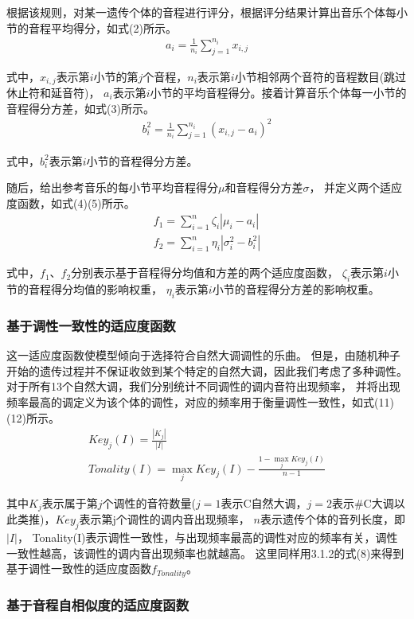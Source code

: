 \documentclass{article}
\begin{document}
根据该规则，对某一遗传个体的音程进行评分，根据评分结果计算出音乐个体每小节的音程平均得分，如式(2)所示。
\begin{align}
    a_i = \frac{1}{n_i}\sum_{j=1}^{n_i} x_{i,j}
\end{align}

式中，$x_{i,j}$表示第$i$小节的第$j$个音程，$n_i$表示第$i$小节相邻两个音符的音程数目(跳过休止符和延音符)，
$a_i$表示第$i$小节的平均音程得分。接着计算音乐个体每一小节的音程得分方差，如式(3)所示。
\begin{align}
    b_i ^2 = \frac{1}{n_i}\sum_{j=1}^{n_i} (x_{i,j}-a_i)^2
\end{align}

式中，$b_i ^2$表示第$i$小节的音程得分方差。

随后，给出参考音乐的每小节平均音程得分$\mu$和音程得分方差$\sigma$，
并定义两个适应度函数，如式(4)(5)所示。
\begin{align}
    f_1=\sum_{i=1}^{n}\zeta_i | \mu_i-a_i |\\
    f_2=\sum_{i=1}^{n}\eta_i | \sigma_i ^2-b_i ^2 |
\end{align}

式中，$f_1$、$f_2$分别表示基于音程得分均值和方差的两个适应度函数，
$\zeta_i$表示第$i$小节的音程得分均值的影响权重，
$\eta_i$表示第$i$小节的音程得分方差的影响权重。

\subsubsection{基于调性一致性的适应度函数}

这一适应度函数使模型倾向于选择符合自然大调调性的乐曲。
但是，由随机种子开始的遗传过程并不保证收敛到某个特定的自然大调，因此我们考虑了多种调性。
对于所有13个自然大调，我们分别统计不同调性的调内音符出现频率，
并将出现频率最高的调定义为该个体的调性，对应的频率用于衡量调性一致性，如式(11)(12)所示。
\begin{gather}
    Key_j(I) = \frac{|K_j|}{|I|}\\
    Tonality(I) = \max_j Key_j(I)-\frac{1-\max_j Key_j(I)}{n-1}
\end{gather}

其中$K_j$表示属于第$j$个调性的音符数量($j=1$表示C自然大调，$j=2$表示\#C大调以此类推)，$Key_j$表示第j个调性的调内音出现频率，
$n$表示遗传个体的音列长度，即$|I|$，
Tonality(I)表示调性一致性，与出现频率最高的调性对应的频率有关，调性一致性越高，该调性的调内音出现频率也就越高。
这里同样用3.1.2的式(8)来得到基于调性一致性的适应度函数$f_{Tonality}$。

\subsubsection{基于音程自相似度的适应度函数}
\end{document}
